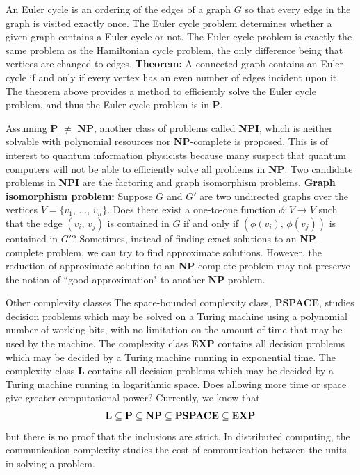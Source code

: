 \documentclass{beamer}
\begin{document}
\begin{frame}
\justify
An Euler cycle is an ordering of the edges of a graph $G$ so that every edge in the graph is visited exactly once.
\vfill
The Euler cycle problem determines whether a given graph contains a Euler cycle or not.
\vfill
The Euler cycle problem is exactly the same problem as the Hamiltonian cycle problem, the only difference being that vertices are changed to edges.
\vfill
\textbf{Theorem:} A connected graph contains an Euler cycle if and only if every vertex has an even number of edges incident upon it.
\vfill
The theorem above provides a method to efficiently solve the Euler cycle problem, and thus the Euler cycle problem is in \textbf{P}.
\end{frame}

\begin{frame}
\justify
Assuming \textbf{P} $\neq$ \textbf{NP}, another class of problems called \textbf{NPI}, which is neither solvable with polynomial resources nor \textbf{NP}-complete is proposed.
\vfill
This is of interest to quantum information physicists because many suspect that quantum computers will not be able to efficiently solve all problems in \textbf{NP}.
\vfill
Two candidate problems in \textbf{NPI} are the factoring and graph isomorphism problems.
\vfill
\textbf{Graph isomorphism problem:} Suppose $G$ and $G'$ are two undirected graphs over the vertices $V = \{ v_1,\, \ldots,\, v_n\}$. Does there exist a one-to-one function $\phi : V \rightarrow V$ such that the edge $(v_i,\, v_j)$ is contained in $G$ if and only if $(\phi(v_i),\, \phi(v_j))$ is contained in $G'$?
\vfill
Sometimes, instead of finding exact solutions to an \textbf{NP}-complete problem, we can try to find approximate solutions.
\vfill
However, the reduction of approximate solution to an \textbf{NP}-complete problem may not preserve the notion of ``good approximation" to another \textbf{NP} problem.
\end{frame}

\begin{frame}{Other complexity classes}
\justify
The space-bounded complexity class, \textbf{PSPACE}, studies decision problems which may be solved on a Turing machine using a polynomial number of working bits, with no limitation on the amount of time that may be used by the machine.
\vfill
The complexity class \textbf{EXP} contains all decision problems which may be decided by a Turing machine running in exponential time.
\vfill
The complexity class \textbf{L} contains all decision problems which may be decided by a Turing machine running in logarithmic space.
\vfill
Does allowing more time or space give greater computational power?
\vfill
Currently, we know that
\begin{align}
\text{\textbf{L}} \subseteq \text{\textbf{P}} \subseteq \text{\textbf{NP}} \subseteq \text{\textbf{PSPACE}} \subseteq \text{\textbf{EXP}}
\end{align}
but there is no proof that the inclusions are strict.
\vfill
In distributed computing, the communication complexity studies the cost of communication between the units in solving a problem.
\end{frame}
\end{document}
